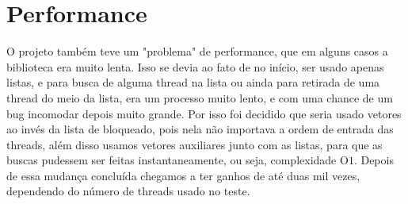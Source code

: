 \documentclass[12pt,a4paper]{report}
\begin{document}
\section{Performance}
	O projeto também teve um "problema" de performance, que em alguns casos a biblioteca era muito lenta. Isso se devia ao fato de no início, ser usado apenas listas, e para busca de alguma thread na lista ou ainda para retirada de uma thread do meio da lista, era um processo muito lento, e com uma chance de um bug incomodar depois muito grande. Por isso foi decidido que seria usado vetores ao invés da lista de bloqueado, pois nela não importava a ordem de entrada das threads, além disso usamos vetores auxiliares junto com as listas, para que as buscas pudessem ser feitas instantaneamente, ou seja, complexidade O\(1\). Depois de essa mudança concluída chegamos a ter ganhos de até duas mil vezes, dependendo do número de threads usado no teste.
	
\end{document}
